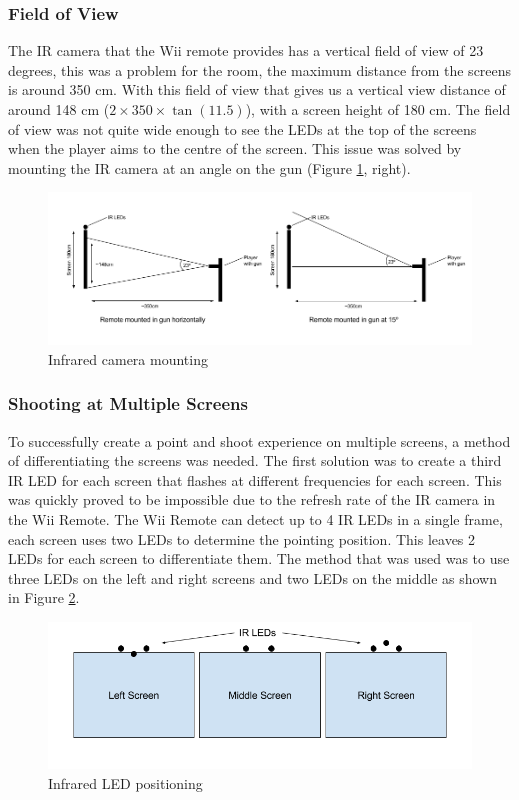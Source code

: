 \documentclass[a4paper,11pt]{article}
\begin{document}
\subsubsection{Field of View}

The IR camera that the Wii remote provides has a vertical field of view of 23 degrees, this was a problem for the room, the maximum distance from the screens is around 350 cm. With this field of view that gives us a vertical view distance of around 148 cm ($2 \times 350 \times \tan(11.5)$), with a screen height of 180 cm. The field of view was not quite wide enough to see the LEDs at the top of the screens when the player aims to the centre of the screen. This issue was solved by mounting the IR camera at an angle on the gun (Figure \ref{fig:ir_mounting}, right).

\begin{figure}
	\centering
	\includegraphics[scale=0.5]{ir}
    \caption{Infrared camera mounting}
    \label{fig:ir_mounting}
\end{figure}

\subsubsection{Shooting at Multiple Screens}
To successfully create a point and shoot experience on multiple screens, a method of differentiating the screens was needed. The first solution was to create a third IR LED for each screen that flashes at different frequencies for each screen. This was quickly proved to be impossible due to the refresh rate of the IR camera in the Wii Remote. The Wii Remote can detect up to 4 IR LEDs in a single frame, each screen uses two LEDs to determine the pointing position. This leaves 2 LEDs for each screen to differentiate them. The method that was used was to use three LEDs on the left and right screens and two LEDs on the middle as shown in Figure \ref{fig:led_pos}. 

\begin{figure}
	\centering
	\includegraphics[scale=0.5]{led_pos}
    \caption{Infrared LED positioning}
    \label{fig:led_pos}
\end{figure}
\end{document}
